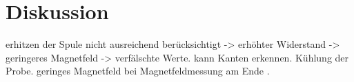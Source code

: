 
\section{Diskussion}
\label{sec:Diskussion}

erhitzen der Spule nicht ausreichend berücksichtigt -> erhöhter Widerstand -> geringeres Magnetfeld -> verfälschte Werte.
kann Kanten erkennen. Kühlung der Probe.
geringes Magnetfeld bei Magnetfeldmessung am Ende .